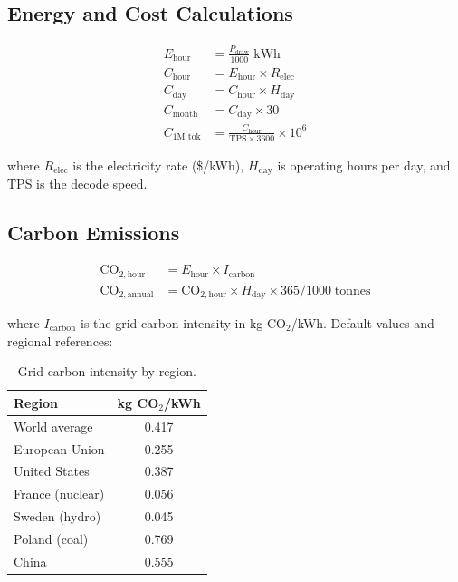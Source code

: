 \documentclass[11pt,a4paper]{article}
\theoremstyle{definition}
\begin{document}
\subsection{Energy and Cost Calculations}

\begin{align}
E_{\text{hour}} &= \frac{P_{\text{draw}}}{1000} \;\text{kWh} \label{eq:energy} \\
C_{\text{hour}} &= E_{\text{hour}} \times R_{\text{elec}} \label{eq:costhr} \\
C_{\text{day}} &= C_{\text{hour}} \times H_{\text{day}} \label{eq:costday} \\
C_{\text{month}} &= C_{\text{day}} \times 30 \label{eq:costmonth} \\
C_{\text{1M tok}} &= \frac{C_{\text{hour}}}{\text{TPS} \times 3600} \times 10^6 \label{eq:cost1m}
\end{align}

where $R_{\text{elec}}$ is the electricity rate (\$/kWh), $H_{\text{day}}$ is operating hours per day, and TPS is the decode speed.

\subsection{Carbon Emissions}

\begin{align}
\text{CO}_{2,\text{hour}} &= E_{\text{hour}} \times I_{\text{carbon}} \label{eq:co2hr} \\
\text{CO}_{2,\text{annual}} &= \text{CO}_{2,\text{hour}} \times H_{\text{day}} \times 365 / 1000 \;\text{tonnes} \label{eq:co2yr}
\end{align}

where $I_{\text{carbon}}$ is the grid carbon intensity in kg CO$_2$/kWh. Default values and regional references:

\begin{table}[htbp]
\centering
\caption{Grid carbon intensity by region.}\label{tab:carbon}
\begin{tabular}{lc}
\toprule
\textbf{Region} & \textbf{kg CO$_2$/kWh} \\
\midrule
World average & 0.417 \\
European Union & 0.255 \\
United States & 0.387 \\
France (nuclear) & 0.056 \\
Sweden (hydro) & 0.045 \\
Poland (coal) & 0.769 \\
China & 0.555 \\
\bottomrule
\end{tabular}
\end{table}
\end{document}
